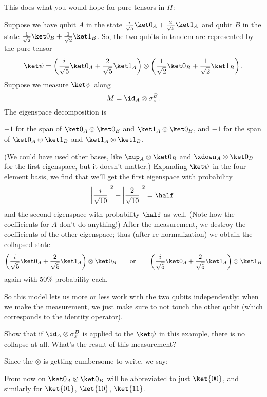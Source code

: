 This does what you would hope for pure tensors in $H$:
\begin{example}
	Suppose we have qubit $A$ in the state
	$\frac{i}{\sqrt5}\ket0_A + \frac{2}{\sqrt5}\ket1_A$
	and qubit $B$ in the state
	$\frac{1}{\sqrt2} \ket0_B + \frac{1}{\sqrt2}\ket1_B$.
	So, the two qubits in tandem are represented by the pure tensor
	\[
		\ket\psi
		=
		\left( \frac{i}{\sqrt5}\ket0_A + \frac{2}{\sqrt5}\ket1_A \right)
		\otimes
		\left( \frac{1}{\sqrt2} \ket0_B + \frac{1}{\sqrt2}\ket1_B \right).
	\]
	Suppose we measure $\ket\psi$ along
	\[ M = \id_A \otimes \sigma_z^B. \]
	The eigenspace decomposition is
	\begin{itemize}
		\ii $+1$ for the span of $\ket0_A \otimes \ket0_B$ and
		$\ket1_A \otimes \ket0_B$, and
		\ii $-1$ for the span of $\ket0_A \otimes \ket1_B$ and
		$\ket1_A \otimes \ket1_B$.
	\end{itemize}
	(We could have used other bases, like $\xup_A \otimes \ket0_B$ and
	$\xdown_A \otimes \ket0_B$ for the first eigenspace, but it doesn't matter.)
	Expanding $\ket\psi$ in the four-element basis, we find that
	we'll get the first eigenspace with probability
	\[ \left|\frac{i}{\sqrt{10}}\right|^2
	+ \left|\frac{2}{\sqrt{10}}\right|^2 = \half. \]
	and the second eigenspace with probability $\half$ as well.
	(Note how the coefficients for $A$ don't do anything!)
	After the measurement, we destroy the coefficients of the other eigenspace;
	thus (after re-normalization) we obtain the collapsed state
	\[ \left( \frac{i}{\sqrt5}\ket0_A + \frac{2}{\sqrt5}\ket1_A \right)
		\otimes \ket0_B
		\qquad\text{or}\qquad
		\left( \frac{i}{\sqrt5}\ket0_A + \frac{2}{\sqrt5}\ket1_A \right)
		\otimes \ket1_B
	\]
	again with 50\% probability each.
\end{example}
So this model lets us more or less work with the two qubits independently:
when we make the measurement, we just make sure to not touch the other qubit
(which corresponds to the identity operator).

\begin{exercise}
	Show that if $\id_A \otimes \sigma_x^B$ is applied to the $\ket\psi$
	in this example, there is no collapse at all.
	What's the result of this measurement?
\end{exercise}

Since the $\otimes$ is getting cumbersome to write, we say:
\begin{abuse}
	From now on $\ket 0_A \otimes \ket 0_B$ will be abbreviated
	to just $\ket{00}$, and similarly for $\ket{01}$, $\ket{10}$, $\ket{11}$.
\end{abuse}


